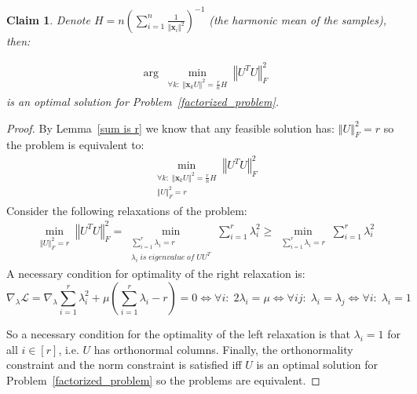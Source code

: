 \documentclass{article}
\newtheorem{claim}{Claim}
\newcommand{\probref}[1]{Problem~\ref{#1}}
\newcommand{\Lemmaref}[1]{Lemma~\ref{#1}}
\newcommand{\x}{{\mathbf x}}
\newcommand{\norm}[1]{\left\Vert #1\right\Vert}
\begin{document}
\begin{claim} \label{optimization tight frame}
Denote $H=n\left(\sum_{i=1}^{n}\frac{1}{\left\Vert \x_{i}\right\Vert ^{2}}\right)^{-1}$ (the harmonic mean of the samples), then:

\begin{align} \label{multicast formulation}
    \arg\min_{\begin{array}{c}
    \forall k:\;\left\Vert \x_{k}U\right\Vert ^{2}=\frac{r}{n}H
    \end{array}}\norm{U^TU}^2_F
\end{align}
is an optimal solution for \probref{factorized_problem}.
\end{claim}

\begin{proof}
By \Lemmaref{sum is r} we know that any feasible solution has: $\left\Vert U\right\Vert _{F}^{2}=r$ so the problem is equivalent to: 
\begin{align*}
    \min_{\begin{array}{c}
    \forall k:\;\left\Vert \x_{k}U\right\Vert ^{2}=\frac{r}{n}H\\
    \norm{U}^2_F=r
    \end{array}}\norm{U^TU}^2_F
\end{align*}
Consider the following relaxations of the problem:
\begin{align*}
    \min_{\begin{array}{c}
    \norm{U}^2_F=r
    \end{array}}\norm{U^TU}^2_F
    =
    \min_{\begin{array}{c}
    \sum_{i=1}^r\lambda_i=r\\
    \lambda_i \;is\; eigenvalue\; of\; UU^T
    \end{array}}\sum_{i=1}^r\lambda_i^2
    \ge
    \min_{\begin{array}{c}
    \sum_{i=1}^r\lambda_i=r
    \end{array}}\sum_{i=1}^r\lambda_i^2
\end{align*}
A necessary condition for optimality of the right relaxation is:
$$
\nabla_\lambda\mathcal{L}=\nabla_\lambda \sum_{i=1}^r\lambda_i^2+\mu(\sum_{i=1}^r\lambda_i-r)=0\Leftrightarrow\forall i:\;2\lambda_i=\mu\Leftrightarrow\forall ij:\;\lambda_i=\lambda_j\Leftrightarrow\forall i:\;\lambda_i=1
$$


So a necessary condition for the optimality of the left relaxation is that $\lambda_i=1$ for all $i\in[r]$, i.e. $U$ has orthonormal columns. Finally, the orthonormality constraint and the norm constraint is satisfied iff $U$ is an optimal solution for \probref{factorized_problem} so the problems are equivalent.
\end{proof}
\end{document}
